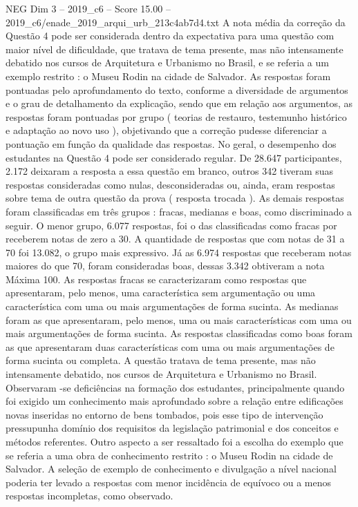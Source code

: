 \begin{textsample}{NEG Dim 3 – 2019\_c6 – Score 15.00 – 2019\_c6/enade\_2019\_arqui\_urb\_213c4ab7d4.txt}
A nota média da correção da Questão 4 pode ser considerada dentro da expectativa para uma questão com maior nível de dificuldade, que tratava de tema presente, mas não intensamente debatido nos cursos de Arquitetura e Urbanismo no Brasil, e se referia a um exemplo restrito : o Museu Rodin na cidade de Salvador.
As respostas foram pontuadas pelo aprofundamento do texto, conforme a diversidade de argumentos e o grau de detalhamento da explicação, sendo que em relação aos argumentos, as respostas foram pontuadas por grupo ( teorias de restauro, testemunho histórico e adaptação ao novo uso ), objetivando que a correção pudesse diferenciar a pontuação em função da qualidade das respostas.
No geral, o desempenho dos estudantes na Questão 4 pode ser considerado regular.
De 28.647 participantes, 2.172 deixaram a resposta a essa questão em branco, outros 342 tiveram suas respostas consideradas como nulas, desconsideradas ou, ainda, eram respostas sobre tema de outra questão da prova ( resposta trocada ).
As demais respostas foram classificadas em três grupos : fracas, medianas e boas, como discriminado a seguir.
O menor grupo, 6.077 respostas, foi o das classificadas como fracas por receberem notas de zero a 30.
A quantidade de respostas que com notas de 31 a 70 foi 13.082, o grupo mais expressivo.
Já as 6.974 respostas que receberam notas maiores do que 70, foram consideradas boas, dessas 3.342 obtiveram a nota Máxima 100.
As respostas fracas se caracterizaram como respostas que apresentaram, pelo menos, uma característica sem argumentação ou uma característica com uma ou mais argumentações de forma sucinta.
As medianas foram as que apresentaram, pelo menos, uma ou mais características com uma ou mais argumentações de forma sucinta.
As respostas classificadas como boas foram as que apresentaram duas características com uma ou mais argumentações de forma sucinta ou completa.
A questão tratava de tema presente, mas não intensamente debatido, nos cursos de Arquitetura e Urbanismo no Brasil.
Observaram -se deficiências na formação dos estudantes, principalmente quando foi exigido um conhecimento mais aprofundado sobre a relação entre edificações novas inseridas no entorno de bens tombados, pois esse tipo de intervenção pressupunha domínio dos requisitos da legislação patrimonial e dos conceitos e métodos referentes.
Outro aspecto a ser ressaltado foi a escolha do exemplo que se referia a uma obra de conhecimento restrito : o Museu Rodin na cidade de Salvador.
A seleção de exemplo de conhecimento e divulgação a nível nacional poderia ter levado a respostas com menor incidência de equívoco ou a menos respostas incompletas, como observado.

\end{textsample}
